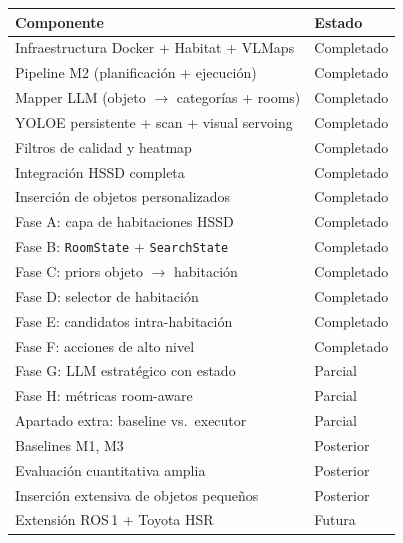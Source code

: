 \documentclass[11pt,a4paper]{article}
\begin{document}
\begin{center}
\begin{tabular}{ll}
\toprule
\textbf{Componente} & \textbf{Estado} \\
\midrule
Infraestructura Docker + Habitat + VLMaps & \textcolor{done}{Completado} \\
Pipeline M2 (planificación + ejecución) & \textcolor{done}{Completado} \\
Mapper LLM (objeto $\rightarrow$ categorías + rooms) & \textcolor{done}{Completado} \\
YOLOE persistente + scan + visual servoing & \textcolor{done}{Completado} \\
Filtros de calidad y heatmap & \textcolor{done}{Completado} \\
Integración HSSD completa & \textcolor{done}{Completado} \\
Inserción de objetos personalizados & \textcolor{done}{Completado} \\
Fase A: capa de habitaciones HSSD & \textcolor{done}{Completado} \\
Fase B: \texttt{RoomState} + \texttt{SearchState} & \textcolor{done}{Completado} \\
Fase C: priors objeto $\rightarrow$ habitación & \textcolor{done}{Completado} \\
\midrule
Fase D: selector de habitación & \textcolor{done}{Completado} \\
Fase E: candidatos intra-habitación & \textcolor{done}{Completado} \\
Fase F: acciones de alto nivel & \textcolor{done}{Completado} \\
Fase G: LLM estratégico con estado & \textcolor{partialcol}{Parcial} \\
Fase H: métricas room-aware & \textcolor{partialcol}{Parcial} \\
\midrule
Apartado extra: baseline vs.\ executor & \textcolor{partialcol}{Parcial} \\
Baselines M1, M3 & \textcolor{partialcol}{Posterior} \\
Evaluación cuantitativa amplia & \textcolor{partialcol}{Posterior} \\
Inserción extensiva de objetos pequeños & \textcolor{partialcol}{Posterior} \\
Extensión ROS\,1 + Toyota HSR & \textcolor{partialcol}{Futura} \\
\bottomrule
\end{tabular}
\end{center}
\end{document}
